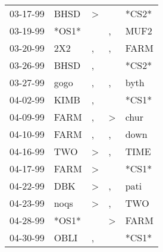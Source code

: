 \begin{supertabular}{p{0.07\textwidth}p{0.06\textwidth}p{0.02\textwidth}p{0.02\textwidth}p{0.06\textwidth}}
          03-17-99\textsuperscript{} &           BHSD\textsuperscript{} &     \textgreater &                  &                            *CS2* \\
          03-19-99\textsuperscript{} &                            *OS1* &                  &                , &           MUF2\textsuperscript{} \\
          03-20-99\textsuperscript{} &            2X2\textsuperscript{} &                , &                , &           FARM\textsuperscript{} \\
          03-26-99\textsuperscript{} &           BHSD\textsuperscript{} &                , &                  &                            *CS2* \\
          03-27-99\textsuperscript{} &           gogo\textsuperscript{} &                , &                , &           byth\textsuperscript{} \\
          04-02-99\textsuperscript{} &           KIMB\textsuperscript{} &                , &                  &                            *CS1* \\
          04-09-99\textsuperscript{} &           FARM\textsuperscript{} &                , &     \textgreater &           chur\textsuperscript{} \\
          04-10-99\textsuperscript{} &           FARM\textsuperscript{} &                , &                , &           down\textsuperscript{} \\
          04-16-99\textsuperscript{} &            TWO\textsuperscript{} &     \textgreater &                , &           TIME\textsuperscript{} \\
          04-17-99\textsuperscript{} &           FARM\textsuperscript{} &     \textgreater &                  &                            *CS1* \\
          04-22-99\textsuperscript{} &            DBK\textsuperscript{} &     \textgreater &                , &           pati\textsuperscript{} \\
          04-23-99\textsuperscript{} &           noqs\textsuperscript{} &     \textgreater &                , &            TWO\textsuperscript{} \\
          04-28-99\textsuperscript{} &                            *OS1* &                  &     \textgreater &           FARM\textsuperscript{} \\
          04-30-99\textsuperscript{} &           OBLI\textsuperscript{} &                , &                  &                            *CS1* \\

\end{supertabular}
